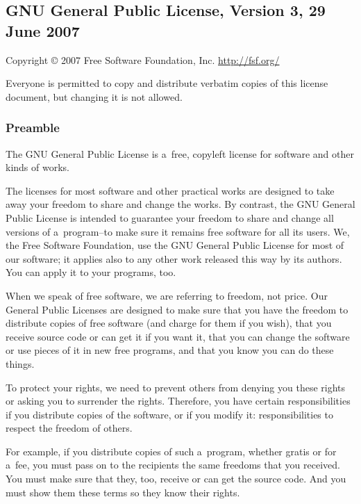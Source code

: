 \documentclass[a4paper, 11pt, twoside]{article}
\begin{document}
\begingroup
\fontsize{7pt}{8pt}
\selectfont

\subsection{GNU General Public License, Version 3, 29 June 2007}

Copyright © 2007 Free Software Foundation, Inc. \url{http://fsf.org/}

Everyone is permitted to copy and distribute verbatim copies of this license document, but changing it is not allowed.

\subsubsection{Preamble}

The GNU General Public License is a~free, copyleft license for software and other kinds of works.

The licenses for most software and other practical works are designed to take away your freedom to share and change the works. By contrast, the GNU General Public License is intended to guarantee your freedom to share and change all versions of a~program--to make sure it remains free software for all its users. We, the Free Software Foundation, use the GNU General Public License for most of our software; it applies also to any other work released this way by its authors. You can apply it to your programs, too.

When we speak of free software, we are referring to freedom, not price. Our General Public Licenses are designed to make sure that you have the freedom to distribute copies of free software (and charge for them if you wish), that you receive source code or can get it if you want it, that you can change the software or use pieces of it in new free programs, and that you know you can do these things.

To protect your rights, we need to prevent others from denying you these rights or asking you to surrender the rights. Therefore, you have certain responsibilities if you distribute copies of the software, or if you modify it: responsibilities to respect the freedom of others.

For example, if you distribute copies of such a~program, whether gratis or for a~fee, you must pass on to the recipients the same freedoms that you received. You must make sure that they, too, receive or can get the source code. And you must show them these terms so they know their rights.
\end{document}
